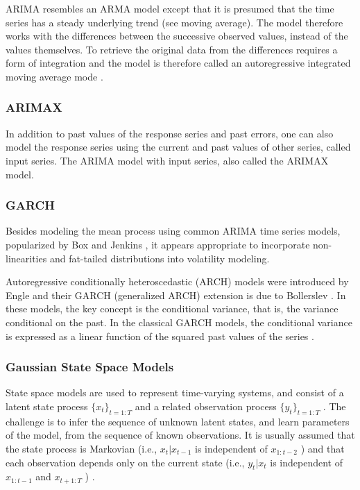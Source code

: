 \documentclass{acm_proc_article-sp}
\begin{document}
ARIMA resembles an ARMA model except that it is presumed 
that the time series has a steady underlying trend (see moving average). 
The model therefore works with the differences between the successive observed values, 
instead of the values themselves. To retrieve the original 
data from the differences requires a form of integration 
and the model is therefore called an autoregressive 
integrated moving average mode \cite{Graham:arima}.

\subsubsection{ARIMAX}

In addition to past values of the response series and past errors, 
one can also model the response series using the current and past 
values of other series, called input series. The ARIMA model with
 input series, also called the ARIMAX model\cite{HYP:HYP9381}.

\subsubsection{GARCH}


Besides modeling the mean process using common
ARIMA time series models, popularized by Box and Jenkins \cite{Box:box}, it appears 
appropriate to incorporate non-linearities and fat-tailed distributions into volatility
modeling.\cite{Zeitlberger2016}

Autoregressive conditionally heteroscedastic (ARCH) models were introduced by Engle \cite{RePEc:ecm:emetrp:v:50:y:1982:i:4:p:987-1007}
and their GARCH (generalized ARCH) extension is due to Bollerslev \cite{RePEc:eee:econom:v:31:y:1986:i:3:p:307-327}. In these models,
the key concept is the conditional variance, that is, the variance conditional on the past. In the
classical GARCH models, the conditional variance is expressed as a linear function of the squared
past values of the series \cite{Francq:garch}.


\subsubsection{Gaussian State Space Models}

State space models are used to represent time-varying systems,
and consist of a latent state process $\{x_t\}_{t=1:T}$ and a related
observation process $\{y_t\}_{t=1:T}$ . The challenge is to infer
the sequence of unknown latent states, and learn parameters of
the model, from the sequence of known observations. It is usually
assumed that the state process is Markovian (i.e., $x_t|x_{t−1}$
is independent of $x_{1:t−2}$ ) and that each observation depends
only on the current state (i.e., $y_t|x_t$ is independent of $x_{1:t−1}$ and
$x_{t+1:T}$ ) \cite{7468569}. 
\end{document}
